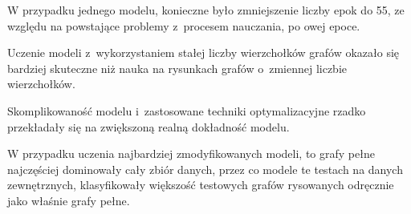 W przypadku jednego modelu, konieczne było zmniejszenie liczby epok do 55,
ze względu na powstające problemy z~procesem nauczania, po owej epoce.

Uczenie modeli z~wykorzystaniem stałej liczby wierzchołków grafów okazało się bardziej skuteczne
niż nauka na rysunkach grafów o~zmiennej liczbie wierzchołków.

Skomplikowaność modelu i~zastosowane techniki optymalizacyjne rzadko przekładały się na zwiększoną realną dokładność modelu.

W przypadku uczenia najbardziej zmodyfikowanych modeli, to grafy pełne najczęściej dominowały cały zbiór danych,
przez co modele te testach na danych zewnętrznych,
klasyfikowały większość testowych grafów rysowanych odręcznie jako właśnie grafy pełne.